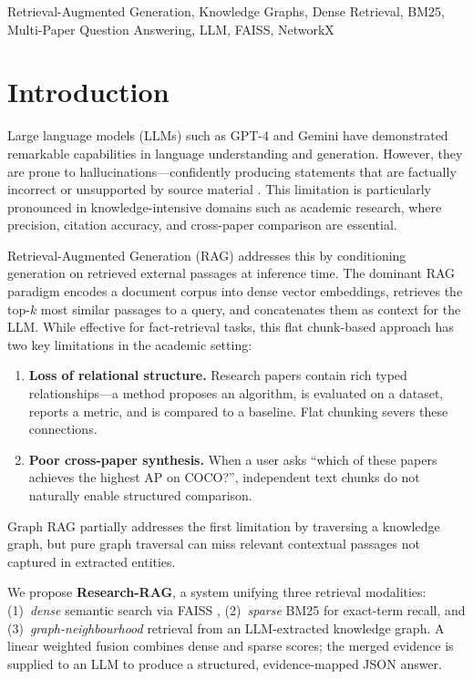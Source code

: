 \documentclass[conference]{IEEEtran}
\begin{document}
\begin{IEEEkeywords}
Retrieval-Augmented Generation, Knowledge Graphs, Dense Retrieval,
BM25, Multi-Paper Question Answering, LLM, FAISS, NetworkX
\end{IEEEkeywords}

\section{Introduction}
\label{sec:intro}

Large language models (LLMs) such as GPT-4 \cite{openai2023gpt4} and
Gemini \cite{team2023gemini} have demonstrated remarkable capabilities in
language understanding and generation. However, they are prone to
hallucinations---confidently producing statements that are factually
incorrect or unsupported by source material \cite{ji2023survey}. This
limitation is particularly pronounced in knowledge-intensive domains such
as academic research, where precision, citation accuracy, and cross-paper
comparison are essential.

Retrieval-Augmented Generation (RAG) \cite{lewis2020rag} addresses this by
conditioning generation on retrieved external passages at inference time.
The dominant RAG paradigm encodes a document corpus into dense vector
embeddings, retrieves the top-$k$ most similar passages to a query, and
concatenates them as context for the LLM. While effective for
fact-retrieval tasks, this flat chunk-based approach has two key
limitations in the academic setting:

\begin{enumerate}
  \item \textbf{Loss of relational structure.} Research papers contain
  rich typed relationships---a method proposes an algorithm, is evaluated
  on a dataset, reports a metric, and is compared to a baseline. Flat
  chunking severs these connections.
  \item \textbf{Poor cross-paper synthesis.} When a user asks ``which of
  these papers achieves the highest AP on COCO?'', independent text
  chunks do not naturally enable structured comparison.
\end{enumerate}

Graph RAG \cite{edge2024graphrag} partially addresses the first limitation
by traversing a knowledge graph, but pure graph traversal can miss
relevant contextual passages not captured in extracted entities.

We propose \textbf{Research-RAG}, a system unifying three retrieval
modalities: (1)~\emph{dense} semantic search via FAISS
\cite{johnson2019billion}, (2)~\emph{sparse} BM25
\cite{robertson2009probabilistic} for exact-term recall, and
(3)~\emph{graph-neighbourhood} retrieval from an LLM-extracted knowledge
graph. A linear weighted fusion combines dense and sparse scores; the
merged evidence is supplied to an LLM to produce a structured,
evidence-mapped JSON answer.
\end{document}
